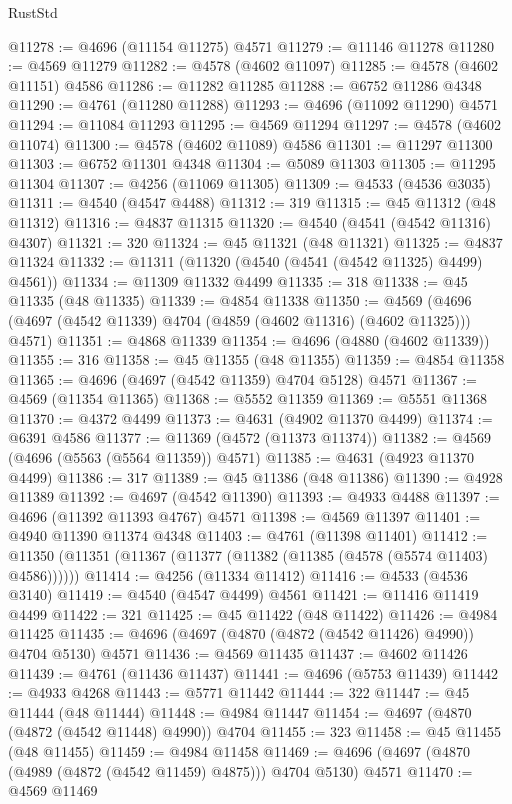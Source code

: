 \begin{lexlean}{RustStd}
\begin{coremodule}
@11278 := @4696 (@11154 @11275) @4571
@11279 := @11146 @11278
@11280 := @4569 @11279
@11282 := @4578 (@4602 @11097)
@11285 := @4578 (@4602 @11151) @4586
@11286 := @11282 @11285
@11288 := @6752 @11286 @4348
@11290 := @4761 (@11280 @11288)
@11293 := @4696 (@11092 @11290) @4571
@11294 := @11084 @11293
@11295 := @4569 @11294
@11297 := @4578 (@4602 @11074)
@11300 := @4578 (@4602 @11089) @4586
@11301 := @11297 @11300
@11303 := @6752 @11301 @4348
@11304 := @5089 @11303
@11305 := @11295 @11304
@11307 := @4256 (@11069 @11305)
@11309 := @4533 (@4536 @3035)
@11311 := @4540 (@4547 @4488)
@11312 := 319
@11315 := @45 @11312 (@48 @11312)
@11316 := @4837 @11315
@11320 := @4540 (@4541 (@4542 @11316) @4307)
@11321 := 320
@11324 := @45 @11321 (@48 @11321)
@11325 := @4837 @11324
@11332 := @11311 (@11320 (@4540 (@4541 (@4542 @11325) @4499) @4561))
@11334 := @11309 @11332 @4499
@11335 := 318
@11338 := @45 @11335 (@48 @11335)
@11339 := @4854 @11338
@11350 := @4569 (@4696 (@4697 (@4542 @11339) @4704 (@4859 (@4602 @11316) (@4602 @11325))) @4571)
@11351 := @4868 @11339
@11354 := @4696 (@4880 (@4602 @11339))
@11355 := 316
@11358 := @45 @11355 (@48 @11355)
@11359 := @4854 @11358
@11365 := @4696 (@4697 (@4542 @11359) @4704 @5128) @4571
@11367 := @4569 (@11354 @11365)
@11368 := @5552 @11359
@11369 := @5551 @11368
@11370 := @4372 @4499
@11373 := @4631 (@4902 @11370 @4499)
@11374 := @6391 @4586
@11377 := @11369 (@4572 (@11373 @11374))
@11382 := @4569 (@4696 (@5563 (@5564 @11359)) @4571)
@11385 := @4631 (@4923 @11370 @4499)
@11386 := 317
@11389 := @45 @11386 (@48 @11386)
@11390 := @4928 @11389
@11392 := @4697 (@4542 @11390)
@11393 := @4933 @4488
@11397 := @4696 (@11392 @11393 @4767) @4571
@11398 := @4569 @11397
@11401 := @4940 @11390 @11374 @4348
@11403 := @4761 (@11398 @11401)
@11412 := @11350 (@11351 (@11367 (@11377 (@11382 (@11385 (@4578 (@5574 @11403) @4586))))))
@11414 := @4256 (@11334 @11412)
@11416 := @4533 (@4536 @3140)
@11419 := @4540 (@4547 @4499) @4561
@11421 := @11416 @11419 @4499
@11422 := 321
@11425 := @45 @11422 (@48 @11422)
@11426 := @4984 @11425
@11435 := @4696 (@4697 (@4870 (@4872 (@4542 @11426) @4990)) @4704 @5130) @4571
@11436 := @4569 @11435
@11437 := @4602 @11426
@11439 := @4761 (@11436 @11437)
@11441 := @4696 (@5753 @11439)
@11442 := @4933 @4268
@11443 := @5771 @11442
@11444 := 322
@11447 := @45 @11444 (@48 @11444)
@11448 := @4984 @11447
@11454 := @4697 (@4870 (@4872 (@4542 @11448) @4990)) @4704
@11455 := 323
@11458 := @45 @11455 (@48 @11455)
@11459 := @4984 @11458
@11469 := @4696 (@4697 (@4870 (@4989 (@4872 (@4542 @11459) @4875))) @4704 @5130) @4571
@11470 := @4569 @11469

\end{coremodule}
\end{lexlean}
